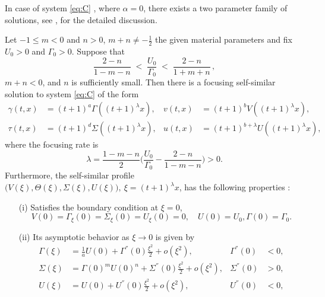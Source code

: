 \documentclass[graybox]{svmult}
\begin{document}
In case of system \eqref{eq:C} , where  $\alpha=0$,  there exists a two parameter family of solutions,  see \cite{KLT_2016}, \cite{LT16} for the detailed discussion. 
\begin{theorem} \label{thm2}
Let $-1\le m<0$ and $n>0$, $m+n\ne -\frac{1}{2}$ the given material parameters and fix $U_0>0$ and $\Gamma_0>0$. Suppose that
\begin{equation*}
 \frac{2-n}{1-m-n} \;<\; \frac{U_0}{\Gamma_0} \;<\; \frac{2-n}{1+m+n} \, ,
\end{equation*}
$m+n<0$, and $n$ is sufficiently small. Then there is a focusing self-similar solution to system \eqref{eq:C} of the form
\begin{equation*}
\begin{aligned}
 \gamma(t,x) &= (t+1)^a\Gamma((t+1)^\lambda x), & v(t,x) &= (t+1)^b V((t+1)^\lambda x), \\
 \tau(t,x) &= (t+1)^d \Sigma((t+1)^\lambda x), & u(t,x) &= (t+1)^{b+\lambda} U((t+1)^\lambda x),
\end{aligned}
\end{equation*}
where the focusing rate is
\begin{equation}
 \lambda = \frac{1-m-n}{2}\Big(\frac{U_0}{\Gamma_0} - \frac{2-n}{1-m-n}\Big)>0. \label{eq:lambdaC}
\end{equation}
Furthermore, the self-similar profile $\big(V(\xi),\Theta(\xi),\Sigma(\xi),U(\xi)\big), \ \xi = (t+1)^\lambda x$,  has the  following properties :
 \begin{enumerate}
  \item[(i)] Satisfies the boundary condition at $\xi=0$,
    \begin{equation*}
    {V}(0) = \Gamma_\xi(0) = \Sigma_\xi(0) = {U}_\xi(0)=0, \quad U(0)=U_0, \Gamma(0)=\Gamma_0.
  \end{equation*}
  \item[(ii)] Its asymptotic behavior as $\xi \rightarrow 0$ is given by 
  \begin{equation} \label{eq:ss_asympC0}
  \begin{aligned}
    \Gamma(\xi) &= \frac{1}{a}U(0) + \Gamma^{''}(0)\frac{\xi^2}{2} + o(\xi^2), & \Gamma^{''}(0)&<0,\\
    \Sigma(\xi) &= \Gamma(0)^{m}{U(0)^n}+ \Sigma^{''}(0)\frac{\xi^2}{2} + o(\xi^2), & \Sigma^{''}(0)&>0, \\
    U(\xi) &= U(0) + U^{''}(0)\frac{\xi^2}{2} + o(\xi^2), & U^{''}(0)&<0,\\

\end{aligned}
\end{equation}
\end{enumerate}
\end{theorem}
\end{document}
